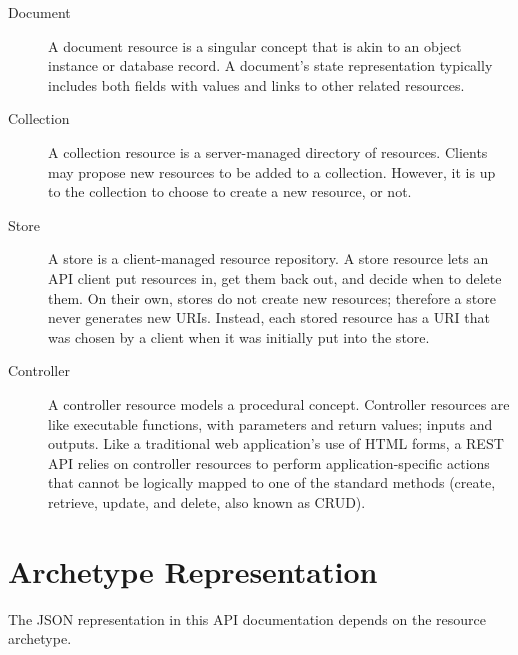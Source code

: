 \documentclass[10pt,a4paper]{scrartcl}
\begin{document}
\begin{description}
	\item[Document] A document resource is a singular concept that is akin to an
	object instance or database record. A document’s state representation typically
	includes both fields with values and links to other related resources.
	
	\item[Collection] A collection resource is a server-managed directory of
	resources. Clients may propose new resources to be added to a
	collection. However, it is up to the collection to choose to create a new
	resource, or not.
	
	\item[Store] A store is a client-managed resource repository. A store resource
	lets an API client put resources in, get them back out, and decide when to
	delete them. On their own, stores do not create new resources; therefore a
	store never generates new URIs. Instead, each stored resource has a URI that
	was chosen by a client when it was initially put into the store.
	
	\item[Controller] A controller resource models a procedural concept. Controller
	resources are like executable functions, with parameters and return values;
	inputs and outputs. Like a traditional web application’s use of HTML forms, a
	REST API relies on controller resources to perform application-specific actions
	that cannot be logically mapped to one of the standard methods (create,
	retrieve, update, and delete, also known as CRUD).
\end{description}


\pagebreak


\section{Archetype Representation}

The JSON representation in this API documentation depends on the resource
archetype.
\end{document}
